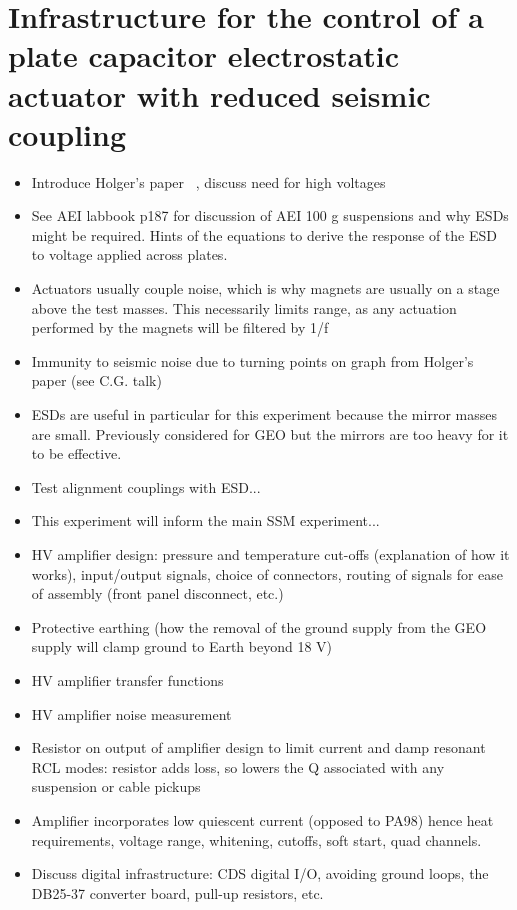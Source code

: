 \chapter{\label{c:esd-concept}Infrastructure for the control of a plate capacitor electrostatic actuator with reduced seismic coupling}

\begin{itemize}
  \item Introduce Holger's paper~\cite{Wittel2015} \etal{}, discuss need for high voltages
  \item See AEI labbook p187 for discussion of AEI 100 g suspensions and why ESDs might be required. Hints of the equations to derive the response of the ESD to voltage applied across plates.
  \item Actuators usually couple noise, which is why magnets are usually on a stage above the test masses. This necessarily limits range, as any actuation performed by the magnets will be filtered by 1/f
  \item Immunity to seismic noise due to turning points on graph from Holger's paper (see C.G. talk)
  \item ESDs are useful in particular for this experiment because the mirror masses are small. Previously considered for GEO but the mirrors are too heavy for it to be effective.
  \item Test alignment couplings with ESD...
  \item This experiment will inform the main SSM experiment...
  \item HV amplifier design: pressure and temperature cut-offs (explanation of how it works), input/output signals, choice of connectors, routing of signals for ease of assembly (front panel disconnect, etc.)
  \item Protective earthing (how the removal of the ground supply from the GEO supply will clamp ground to Earth beyond 18 V)
  \item HV amplifier transfer functions
  \item HV amplifier noise measurement
  \item Resistor on output of amplifier design to limit current and damp resonant RCL modes: resistor adds loss, so lowers the Q associated with any suspension or cable pickups
  \item Amplifier incorporates low quiescent current (opposed to PA98) hence heat requirements, voltage range, whitening, cutoffs, soft start, quad channels.
  \item Discuss digital infrastructure: CDS digital I/O, avoiding ground loops, the DB25-37 converter board, pull-up resistors, etc.
\end{itemize}

